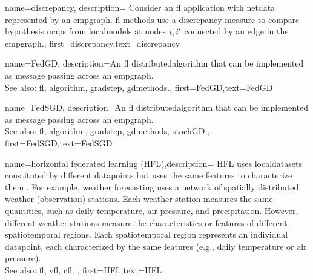 {name=discrepancy,
	description={
		Consider an \gls{fl} application with \gls{netdata} 
		represented by an \gls{empgraph}. \gls{fl} methods use a discrepancy measure 
		to compare \gls{hypothesis} maps from \gls{localmodel}s at nodes $i,i'$ 
		connected by an edge in the \gls{empgraph}.},
	first={discrepancy},text={discrepancy}
}

{name={FedGD},
	description={An \gls{fl} \gls{distributedalgorithm} that 
		can be implemented as message passing across an \gls{empgraph}. 
		\\ 
		See also: \gls{fl}, \gls{algorithm}, \gls{gradstep}, \gls{gdmethods}.},
	first={FedGD},text={FedGD}
} 

{name={FedSGD},
	description={An \gls{fl} \gls{distributedalgorithm} that 
		can be implemented as message passing across an \gls{empgraph}. 
		\\ 
		See also: \gls{fl}, \gls{algorithm}, \gls{gradstep}, \gls{gdmethods}, \gls{stochGD}.},
	first={FedSGD},text={FedSGD}
} 

{name={horizontal federated learning (HFL)},description=
	{HFL uses \gls{localdataset}s constituted by different
		\gls{datapoint}s but uses the same \gls{feature}s to characterize them \cite{HFLChapter2020}.
		For example, weather forecasting uses a network of spatially distributed
		weather (observation) stations. Each weather station measures the
		same quantities, such as daily temperature, air pressure, and precipitation.
		However, different weather stations measure the characteristics or
		\gls{feature}s of different spatiotemporal regions. Each spatiotemporal region 
		represents an individual \gls{datapoint}, each characterized by the same \gls{feature}s 
		(e.g., daily temperature or air pressure).\\
		See also: \gls{fl}, \gls{vfl}, \gls{cfl}. },
	first={HFL},text={HFL}
} 


